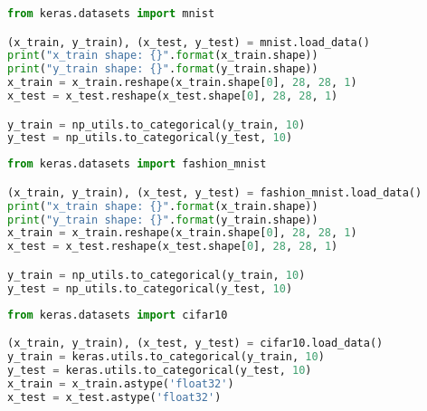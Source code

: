 \begin{lstlisting}[language=Python,label={code:mnist},caption={Code for loading MNIST dataset}]
from keras.datasets import mnist

(x_train, y_train), (x_test, y_test) = mnist.load_data()
print("x_train shape: {}".format(x_train.shape))
print("y_train shape: {}".format(y_train.shape))
x_train = x_train.reshape(x_train.shape[0], 28, 28, 1)
x_test = x_test.reshape(x_test.shape[0], 28, 28, 1)

y_train = np_utils.to_categorical(y_train, 10)
y_test = np_utils.to_categorical(y_test, 10)
\end{lstlisting}

\begin{lstlisting}[language=Python,label={code:fashionmnist},caption={Code for loading Fashion MNIST dataset}]
from keras.datasets import fashion_mnist

(x_train, y_train), (x_test, y_test) = fashion_mnist.load_data()
print("x_train shape: {}".format(x_train.shape))
print("y_train shape: {}".format(y_train.shape))
x_train = x_train.reshape(x_train.shape[0], 28, 28, 1)
x_test = x_test.reshape(x_test.shape[0], 28, 28, 1)

y_train = np_utils.to_categorical(y_train, 10)
y_test = np_utils.to_categorical(y_test, 10)
\end{lstlisting}

\begin{lstlisting}[language=Python,label={code:cifar10},caption={Code for loading CIFAR-10 dataset}]
from keras.datasets import cifar10

(x_train, y_train), (x_test, y_test) = cifar10.load_data()
y_train = keras.utils.to_categorical(y_train, 10)
y_test = keras.utils.to_categorical(y_test, 10)
x_train = x_train.astype('float32')
x_test = x_test.astype('float32')
\end{lstlisting}



